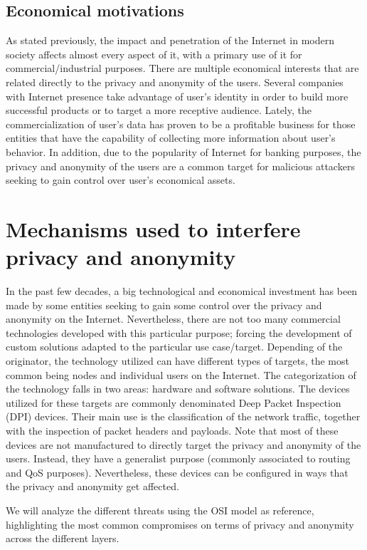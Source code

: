 \documentclass[conference]{IEEEtran}
\begin{document}
\subsection{Economical motivations}

As stated previously, the impact and penetration of the Internet in 
modern society affects almost every aspect of it, with a primary use of it  
for commercial/industrial purposes. There are multiple economical
interests that are related directly to the privacy and anonymity of the
users. Several companies with Internet presence take advantage of
user's identity in order to build more successful products or to target a
more receptive audience. Lately, the commercialization of user's data has
proven to be a profitable business for those entities that have the
capability of collecting more information about user's behavior. In
addition, due to the popularity of Internet for banking purposes,
the privacy and anonymity of the users are a common target for malicious
attackers seeking to gain control over user's economical assets.

\section{Mechanisms used to interfere privacy and anonymity}

In the past few decades, a big technological and economical investment
has been made by some entities seeking to gain some control over the
privacy and anonymity on the Internet. Nevertheless, there are not too
many commercial technologies developed with this particular
purpose\cite{taxo}; forcing the development of custom solutions
adapted to the particular use case/target. Depending of the
originator, the technology utilized can have different types of
targets, the most common being nodes and individual users on the
Internet. The categorization of the technology falls in two areas:
hardware and software solutions. The devices utilized for these
targets are commonly denominated Deep Packet Inspection (DPI)
devices. Their main use is the classification of the network traffic,
together with the inspection of packet headers and payloads. Note that
most of these devices are not manufactured to directly target the privacy
and anonymity of the users. Instead, they have a generalist
purpose (commonly associated to routing and QoS
purposes). Nevertheless, these devices can be configured in ways that
the privacy and anonymity get affected.
 
We will analyze the different threats using the OSI model\cite{OSI} as
reference, highlighting the most common compromises on terms of privacy and
anonymity across the different layers.
\end{document}

